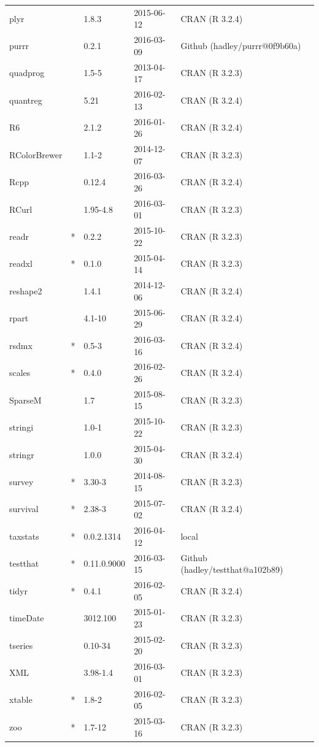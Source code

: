 \documentclass{grattan}\usepackage[]{graphicx}\usepackage[]{color}
\begin{document}
\begin{longtable}{lllll}
  plyr &  & 1.8.3 & 2015-06-12 & CRAN (R 3.2.4) \\ 
  purrr &  & 0.2.1 & 2016-03-09 & Github (hadley/purrr@0f9b60a) \\ 
  quadprog &  & 1.5-5 & 2013-04-17 & CRAN (R 3.2.3) \\ 
  quantreg &  & 5.21 & 2016-02-13 & CRAN (R 3.2.4) \\ 
  R6 &  & 2.1.2 & 2016-01-26 & CRAN (R 3.2.4) \\ 
  RColorBrewer &  & 1.1-2 & 2014-12-07 & CRAN (R 3.2.3) \\ 
  Rcpp &  & 0.12.4 & 2016-03-26 & CRAN (R 3.2.4) \\ 
  RCurl &  & 1.95-4.8 & 2016-03-01 & CRAN (R 3.2.3) \\ 
  readr & * & 0.2.2 & 2015-10-22 & CRAN (R 3.2.3) \\ 
  readxl & * & 0.1.0 & 2015-04-14 & CRAN (R 3.2.3) \\ 
  reshape2 &  & 1.4.1 & 2014-12-06 & CRAN (R 3.2.4) \\ 
  rpart &  & 4.1-10 & 2015-06-29 & CRAN (R 3.2.4) \\ 
  rsdmx & * & 0.5-3 & 2016-03-16 & CRAN (R 3.2.4) \\ 
  scales & * & 0.4.0 & 2016-02-26 & CRAN (R 3.2.4) \\ 
  SparseM &  & 1.7 & 2015-08-15 & CRAN (R 3.2.3) \\ 
  stringi &  & 1.0-1 & 2015-10-22 & CRAN (R 3.2.3) \\ 
  stringr &  & 1.0.0 & 2015-04-30 & CRAN (R 3.2.4) \\ 
  survey & * & 3.30-3 & 2014-08-15 & CRAN (R 3.2.3) \\ 
  survival & * & 2.38-3 & 2015-07-02 & CRAN (R 3.2.4) \\ 
  taxstats & * & 0.0.2.1314 & 2016-04-12 & local \\ 
  testthat & * & 0.11.0.9000 & 2016-03-15 & Github (hadley/testthat@a102b89) \\ 
  tidyr & * & 0.4.1 & 2016-02-05 & CRAN (R 3.2.4) \\ 
  timeDate &  & 3012.100 & 2015-01-23 & CRAN (R 3.2.3) \\ 
  tseries &  & 0.10-34 & 2015-02-20 & CRAN (R 3.2.3) \\ 
  XML &  & 3.98-1.4 & 2016-03-01 & CRAN (R 3.2.3) \\ 
  xtable & * & 1.8-2 & 2016-02-05 & CRAN (R 3.2.3) \\ 
  zoo & * & 1.7-12 & 2015-03-16 & CRAN (R 3.2.3) \\ 
   \bottomrule
\end{longtable}
\end{document}
